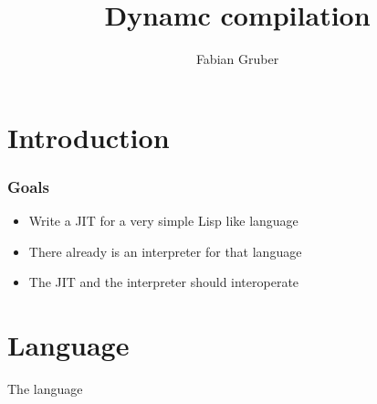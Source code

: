 \documentclass{beamer}
\title{Dynamc compilation}
\author{Fabian Gruber}
\begin{document}
	\frame{\titlepage}


	\section{Introduction}

	\begin{frame}
		\frametitle{Goals}

		\begin{itemize}
			\itemsep12pt

			\item Write a JIT for a very simple Lisp like language
			\item There already is an interpreter for that language
			\item The JIT and the interpreter should interoperate
		\end{itemize}
	\end{frame}


	\section{Language}

	\begin{frame}
		\begin{center}
			\Large{The language}
		\end{center}
	\end{frame}
\end{document}
